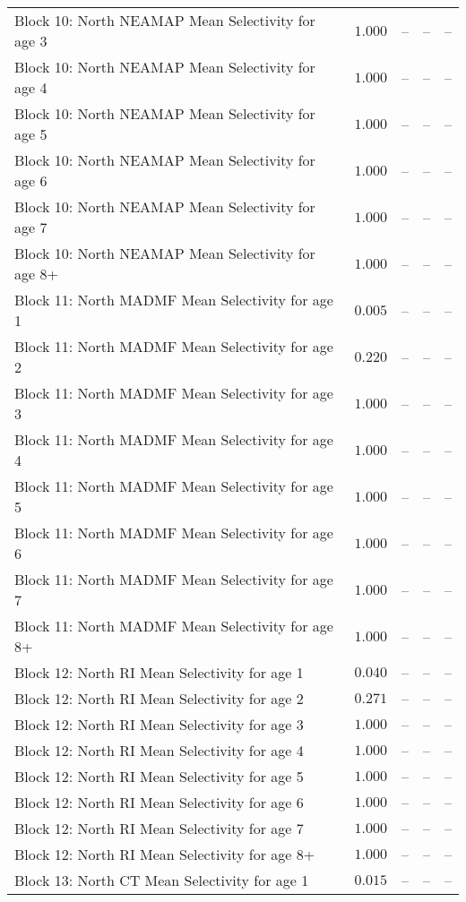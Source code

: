 \documentclass[
]{article}
\begin{document}
\begin{landscape}
\begin{longtable}[t]{lrrrr}
Block 10: North NEAMAP Mean Selectivity for age 3 & $1.000$ & -- & -- & --\\
Block 10: North NEAMAP Mean Selectivity for age 4 & $1.000$ & -- & -- & --\\
Block 10: North NEAMAP Mean Selectivity for age 5 & $1.000$ & -- & -- & --\\
Block 10: North NEAMAP Mean Selectivity for age 6 & $1.000$ & -- & -- & --\\
\addlinespace
Block 10: North NEAMAP Mean Selectivity for age 7 & $1.000$ & -- & -- & --\\
Block 10: North NEAMAP Mean Selectivity for age 8+ & $1.000$ & -- & -- & --\\
Block 11: North MADMF Mean Selectivity for age 1 & $0.005$ & -- & -- & --\\
Block 11: North MADMF Mean Selectivity for age 2 & $0.220$ & -- & -- & --\\
Block 11: North MADMF Mean Selectivity for age 3 & $1.000$ & -- & -- & --\\
\addlinespace
Block 11: North MADMF Mean Selectivity for age 4 & $1.000$ & -- & -- & --\\
Block 11: North MADMF Mean Selectivity for age 5 & $1.000$ & -- & -- & --\\
Block 11: North MADMF Mean Selectivity for age 6 & $1.000$ & -- & -- & --\\
Block 11: North MADMF Mean Selectivity for age 7 & $1.000$ & -- & -- & --\\
Block 11: North MADMF Mean Selectivity for age 8+ & $1.000$ & -- & -- & --\\
\addlinespace
Block 12: North RI Mean Selectivity for age 1 & $0.040$ & -- & -- & --\\
Block 12: North RI Mean Selectivity for age 2 & $0.271$ & -- & -- & --\\
Block 12: North RI Mean Selectivity for age 3 & $1.000$ & -- & -- & --\\
Block 12: North RI Mean Selectivity for age 4 & $1.000$ & -- & -- & --\\
Block 12: North RI Mean Selectivity for age 5 & $1.000$ & -- & -- & --\\
\addlinespace
Block 12: North RI Mean Selectivity for age 6 & $1.000$ & -- & -- & --\\
Block 12: North RI Mean Selectivity for age 7 & $1.000$ & -- & -- & --\\
Block 12: North RI Mean Selectivity for age 8+ & $1.000$ & -- & -- & --\\
Block 13: North CT Mean Selectivity for age 1 & $0.015$ & -- & -- & --\\

\end{longtable}
\end{landscape}
\end{document}
